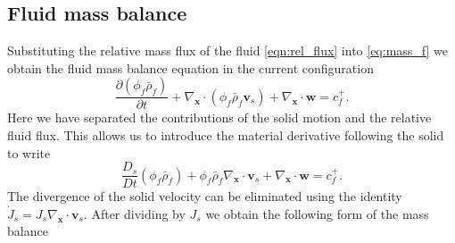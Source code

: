 \documentclass[11pt]{article}
\begin{document}
\subsection{Fluid mass balance}
Substituting the relative mass flux of the fluid \eqref{eqn:rel_flux} into \eqref{eq:mass_f} we obtain the fluid mass balance equation in the current configuration
%
%
\begin{equation*}
\frac{\partial (\phi_f \bar{\rho}_f)}{\partial t} + \nabla_{\mathbf{x}} \cdot (\phi_f \bar{\rho}_f \mathbf{v}_s) + \nabla_{\mathbf{x}} \cdot \mathbf{w} = c^{+}_f.
\end{equation*}
%
Here we have separated the contributions of the solid motion and the relative fluid flux. This allows us to introduce the material derivative following the solid to write
%
\begin{equation}
  \frac{D_s}{Dt} (\phi_f \bar{\rho}_f) + \phi_f \bar{\rho}_f \nabla_{\mathbf{x}} \cdot \mathbf{v}_s + \nabla_{\mathbf{x}} \cdot \mathbf{w} = c^{+}_f \label{eqn:mass_temp}.
\end{equation}
%
The divergence of the solid velocity can be eliminated using the identity $\dot{J}_s = J_s \nabla_{\mathbf{x}} \cdot \mathbf{v}_s$. After dividing by $J_s$ we obtain the following form of the mass balance
%
\end{document}
